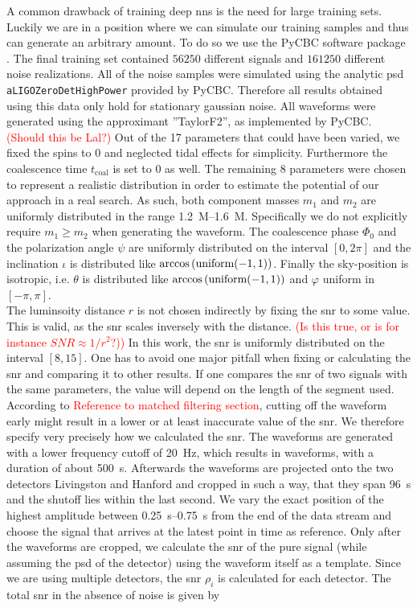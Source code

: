 A common drawback of training deep \gls{nns} is the need for large training sets. Luckily we are in a position where we can simulate our training samples and thus can generate an arbitrary amount. To do so we use the PyCBC software package \cite{pycbc}. The final training set contained $56250$ different signals and $161250$ different noise realizations. All of the noise samples were simulated using the analytic \gls{psd} \verb|aLIGOZeroDetHighPower| provided by PyCBC. Therefore all results obtained using this data only hold for stationary gaussian noise. All waveforms were generated using the approximant ''TaylorF2'', as implemented by PyCBC. \textcolor{red}{(Should this be Lal?)} Out of the 17 parameters that could have been varied, we fixed the spins to $0$ and neglected tidal effects for simplicity. Furthermore the coalescence time $t_\text{coal}$ is set to $0$ as well. The remaining $8$ parameters were chosen to represent a realistic distribution in order to estimate the potential of our approach in a real search. As such, both component masses $m_1$ and $m_2$ are uniformly distributed in the range \SIrange{1.2}{1.6}{M_\odot}. Specifically we do not explicitly require $m_1\geq m_2$ when generating the waveform. The coalescence phase $\Phi_0$  and the polarization angle $\psi$ are uniformly distributed on the interval $\left[0, 2\pi\right]$ and the inclination $\iota$ is distributed like $\arccos{\left( \text{uniform}{\left( -1, 1 \right)} \right)}$. Finally the sky-position is isotropic, i.e. $\theta$ is distributed like $\arccos{\left( \text{uniform}{\left( -1, 1 \right)} \right)}$ and $\varphi$ uniform in $\left[-\pi, \pi\right]$.\\
The luminsoity distance $r$ is not chosen indirectly by fixing the \gls{snr} to some value. This is valid, as the \gls{snr} scales inversely with the distance. \textcolor{red}{(Is this true, or is for instance $SNR\approx 1/r^2$?))} In this work, the \gls{snr} is uniformly distributed on the interval $\left[8,15\right]$. One has to avoid one major pitfall when fixing or calculating the \gls{snr} and comparing it to other results. If one compares the \gls{snr} of two signals with the same parameters, the value will depend on the length of the segment used. According to \textcolor{red}{Reference to matched filtering section}, cutting off the waveform early might result in a lower or at least inaccurate value of the \gls{snr}. We therefore specify very precisely how we calculated the \gls{snr}. The waveforms are generated with a lower frequency cutoff of \SI{20}{\hertz}, which results in waveforms, with a duration of about \SI{500}{\s}. Afterwards the waveforms are projected onto the two detectors Livingston and Hanford and cropped in such a way, that they span \SI{96}{\s} and the shutoff lies within the last second. We vary the exact position of the highest amplitude between \SIrange{0.25}{0.75}{\s} from the end of the data stream and choose the signal that arrives at the latest point in time as reference. Only after the waveforms are cropped, we calculate the \gls{snr} of the pure signal (while assuming the \gls{psd} of the detector) using the waveform itself as a template. Since we are using multiple detectors, the \gls{snr} $\rho_i$ is calculated for each detector. The total \gls{snr} in the absence of noise is given by
